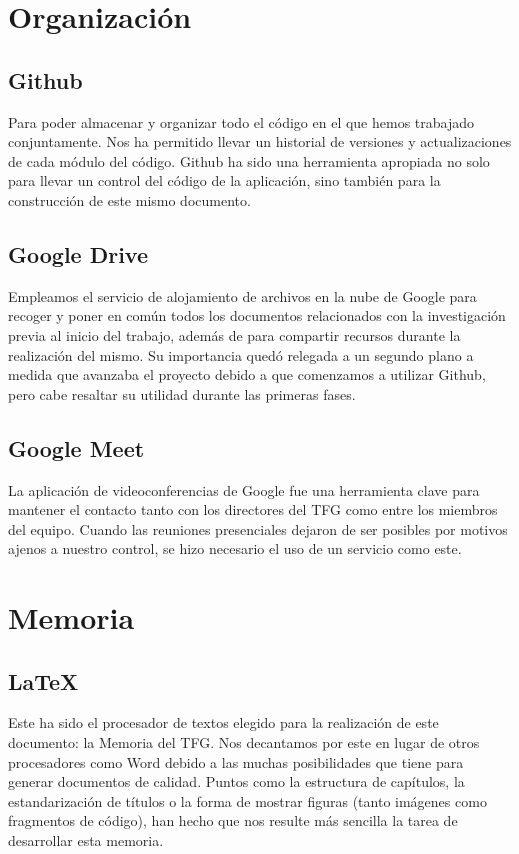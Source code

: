 \section{Organización}

\subsection*{Github}

Para poder almacenar y organizar todo el código en el que hemos trabajado conjuntamente. Nos ha permitido llevar un historial de versiones y actualizaciones de cada módulo del código. Github ha sido una herramienta apropiada no solo para llevar un control del código de la aplicación, sino también para la construcción de este mismo documento.

\subsection*{Google Drive}

Empleamos el servicio de alojamiento de archivos en la nube de Google para recoger y poner en común todos los documentos relacionados con la investigación previa al inicio del trabajo, además de para compartir recursos durante la realización del mismo. Su importancia quedó relegada a un segundo plano a medida que avanzaba el proyecto debido a que comenzamos a utilizar Github, pero cabe resaltar su utilidad durante las primeras fases.

\subsection*{Google Meet}

La aplicación de videoconferencias de Google fue una herramienta clave para mantener el contacto tanto con los directores del TFG como entre los miembros del equipo. Cuando las reuniones presenciales dejaron de ser posibles por motivos ajenos a nuestro control, se hizo necesario el uso de un servicio como este.

\section{Memoria}

\subsection*{LaTeX}

Este ha sido el procesador de textos elegido para la realización de este documento: la Memoria del TFG. Nos decantamos por este en lugar de otros procesadores como Word debido a las muchas posibilidades que tiene para generar documentos de calidad. Puntos como la estructura de capítulos, la estandarización de títulos o la forma de mostrar figuras (tanto imágenes como fragmentos de código), han hecho que nos resulte más sencilla la tarea de desarrollar esta memoria.

